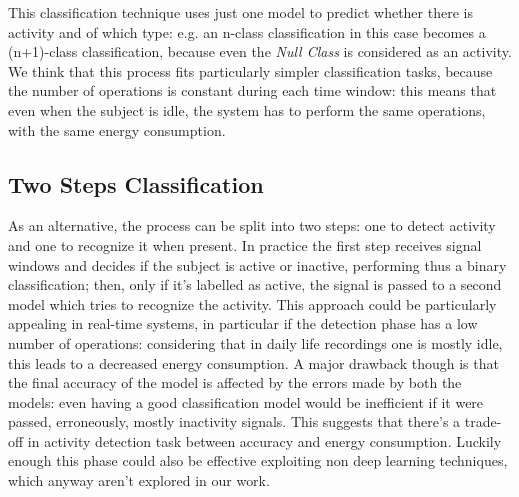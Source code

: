 This classification technique uses just one model to predict whether there is activity and of which type: e.g. an n-class classification in this case becomes a (n+1)-class classification, because even the \textit{Null Class} is considered as an activity. We think that this process fits particularly simpler classification tasks, because the number of operations is constant during each time window: this means that even when the subject is idle, the system has to perform the same operations, with the same energy consumption.

\subsection{Two Steps Classification}
\label{sub:twosteps}

As an alternative, the process can be split into two steps: one to detect activity and one to recognize it when present. In practice the first step receives signal windows and decides if the subject is active or inactive, performing thus a binary classification; then, only if it’s labelled as active, the signal is passed to a second model which tries to recognize the activity. This approach could be particularly appealing in real-time systems, in particular if the detection phase has a low number of operations: considering that in daily life recordings one is mostly idle, this leads to a decreased energy consumption. A major drawback though is that the final accuracy of the model is affected by the errors made by both the models: even having a good classification model would be inefficient if it were passed, erroneously, mostly inactivity signals. This suggests that there’s a trade-off in activity detection task between accuracy and energy consumption. Luckily enough this phase could also be effective exploiting non deep learning techniques, which anyway aren't explored in our work.